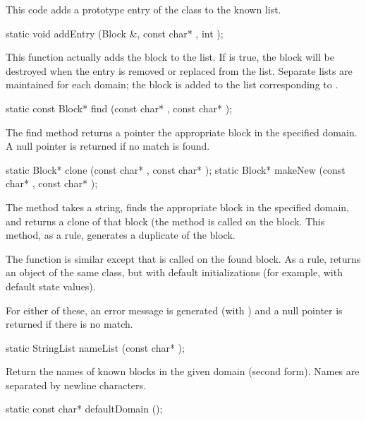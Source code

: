 This code adds a prototype entry of the class to the known list.

\begin{example}
static void addEntry (Block &, const char* , int );
\end{example}

This function actually adds the block to the list.  If  is true,
the block will be destroyed when the entry is removed or replaced from
the list.  Separate lists are maintained for each domain; the block
is added to the list corresponding to .

\begin{example}
static const Block* find (const char* , const char* );
\end{example}

The find method returns a pointer the appropriate block in
the specified domain.  A null pointer is returned if no match
is found.

\begin{example}
static Block* clone (const char* , const char* );
static Block* makeNew (const char* , const char* );
\end{example}

The  method takes a string, finds the appropriate block in
the specified domain, and returns a clone of that block (the
 method is called on the block.  This method, as
a rule, generates a duplicate of the block.

The  function is similar except that 
is called on the found block.  As a rule,  returns
an object of the same class, but with default initializations
(for example, with default state values).

For either of these, an error message is generated (with
) and a null pointer is returned if there is no
match.

\begin{example}
static StringList nameList (const char* );
\end{example}

Return the names of known blocks in
the given domain (second form).  Names are
separated by newline characters.

\begin{example}
static const char* defaultDomain ();
\end{example}

